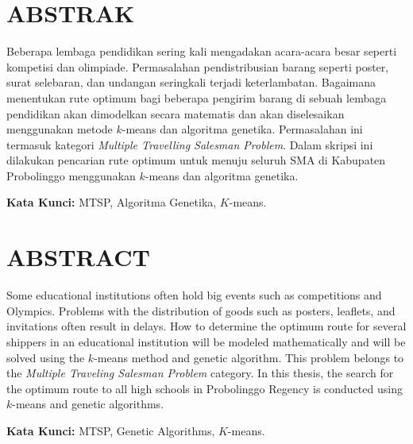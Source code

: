 \newpage
\chapter*{ABSTRAK}

Beberapa lembaga pendidikan sering kali mengadakan acara-acara besar seperti kompetisi dan olimpiade. Permasalahan pendistribusian barang  seperti poster, surat selebaran, dan undangan seringkali terjadi keterlambatan. Bagaimana menentukan rute optimum bagi beberapa pengirim barang di sebuah lembaga pendidikan akan dimodelkan secara matematis dan akan diselesaikan menggunakan metode $k$-means dan algoritma genetika. Permasalahan ini termasuk kategori \textit{Multiple Travelling Salesman Problem}. Dalam skripsi ini dilakukan pencarian rute optimum untuk menuju seluruh SMA di Kabupaten Probolinggo menggunakan $k$-means dan algoritma genetika.

\vspace{0.5cm}

\noindent \textbf{Kata Kunci:} MTSP, Algoritma Genetika, $K$-means.

\chapter*{ABSTRACT}

Some educational institutions often hold big events such as competitions and Olympics. Problems with the distribution of goods such as posters, leaflets, and invitations often result in delays. How to determine the optimum route for several shippers in an educational institution will be modeled mathematically and will be solved using the $k$-means method and genetic algorithm. This problem belongs to the \textit{Multiple Traveling Salesman Problem} category. In this thesis, the search for the optimum route to all high schools in Probolinggo Regency is conducted using $k$-means and genetic algorithms.

\vspace{0.5cm}

\noindent \textbf{Kata Kunci:} MTSP, Genetic Algorithms, $K$-means.